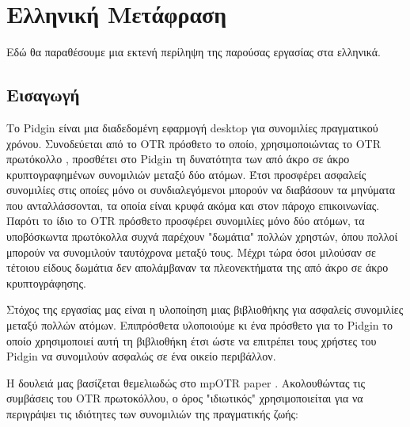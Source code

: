\chapter{Ελληνική Μετάφραση}
\label{appendices:greek}

Εδώ θα παραθέσουμε μια εκτενή περίληψη της παρούσας εργασίας στα ελληνικά.


\section{Εισαγωγή}
Το Pidgin είναι μια διαδεδομένη εφαρμογή desktop για συνομιλίες πραγματικού χρόνου.
Συνοδεύεται από το OTR πρόσθετο το οποίο, χρησιμοποιώντας το OTR πρωτόκολλο \cite{otr} \cite{otr_improvedauth} \cite{otr_userstudy}, προσθέτει στο Pidgin τη δυνατότητα των από άκρο σε άκρο κρυπτογραφημένων συνομιλιών μεταξύ δύο ατόμων.
Έτσι προσφέρει ασφαλείς συνομιλίες στις οποίες μόνο οι συνδιαλεγόμενοι μπορούν να διαβάσουν τα μηνύματα που ανταλλάσσονται, τα οποία είναι κρυφά ακόμα και στον πάροχο επικοινωνίας.
Παρότι το ίδιο το OTR πρόσθετο προσφέρει συνομιλίες μόνο δύο ατόμων, τα υποβόσκωντα πρωτόκολλα συχνά παρέχουν "δωμάτια" πολλών χρηστών, όπου πολλοί μπορούν να συνομιλούν ταυτόχρονα μεταξύ τους.
Μέχρι τώρα όσοι μιλούσαν σε τέτοιου είδους δωμάτια δεν α\-πο\-λά\-μβα\-ναν τα πλεονεκτήματα της από άκρο σε άκρο κρυπτογράφησης.

Στόχος της εργασίας μας είναι η υλοποίηση μιας βιβλιοθήκης για ασφαλείς συνομιλίες μεταξύ πολλών ατόμων.
Επιπρόσθετα υλοποιούμε κι ένα πρόσθετο για το Pidgin το οποίο χρησιμοποιεί αυτή τη βιβλιοθήκη έτσι ώστε να επιτρέπει τους χρήστες του Pidgin να συνομιλούν ασφαλώς σε ένα οικείο περιβάλλον.

Η δουλειά μας βασίζεται θεμελιωδώς στο mpOTR paper \cite{mpotr}.
Ακολουθώντας τις συμβάσεις του OTR πρωτοκόλλου, ο όρος "ιδιωτικός" χρησιμοποιείται για να περιγράψει τις ιδιότητες των συνομιλιών της πραγματικής ζωής:

